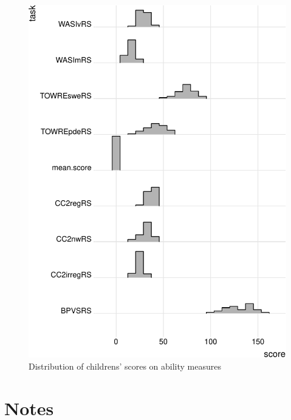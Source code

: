 \documentclass[
  letterpaper,
  DIV=11,
  numbers=noendperiod]{scrreprt}
\begin{document}
\begin{figure}[H]

{\centering \includegraphics{visualization_files/figure-pdf/fig-ridges-grid-1.pdf}

}

\caption{\label{fig-ridges-grid}Distribution of childrens' scores on
ability measures}

\end{figure}

\section{Notes}
\end{document}
